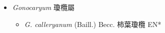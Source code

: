 
  \begin{itemize}
 \item[] \textit{Gonocaryum} 瓊欖屬
                                
  \begin{itemize}
        \item[] \textit{G. calleryanum} (Baill.) Becc.  柿葉瓊欖   EN*
  \end{itemize}
  \end{itemize}
